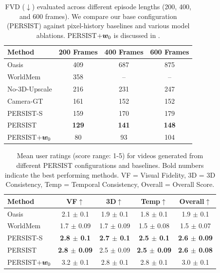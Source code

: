 \begin{table}[t]
  \centering
  \caption{FVD ($\downarrow$) evaluated across different episode lengths (200, 400, and 600 frames). We compare our base configuration (PERSIST) against pixel-history baselines and various model ablations. PERSIST$+{\bm{w}}_0$ is discussed in .}
  \small
  \setlength{\tabcolsep}{6pt}
  \begin{tabular}{lccc}
  \toprule
  Method & 200 Frames & 400 Frames & 600 Frames \\
  \midrule
  Oasis & 409 & 687 & 875 \\
  WorldMem & 358 & -- & -- \\
  \midrule
  No-3D-Upscale & 216 & 231 & 247 \\
  Camera-GT & 161 & 152 & 152 \\
  PERSIST-S & 159 & 170 & 179 \\
  PERSIST & \textbf{129} & \textbf{141} & \textbf{148} \\
  \midrule
  PERSIST$+{\bm{w}}_0$ & 80 & 93 & 104 \\
  \bottomrule
  \end{tabular}
  \label{c4:tab:fvd}
\end{table}

\begin{table}[t]
\centering
\caption{Mean user ratings (score range: 1-5) for videos generated from different PERSIST configurations and baselines. Bold numbers indicate the best performing methods. VF = Visual Fidelity, 3D = 3D Consistency, Temp = Temporal Consistency, Overall = Overall Score.}

\small
\setlength{\tabcolsep}{2.6pt}
\begin{tabular}{lcccc}
    \toprule
    Method & VF$\uparrow$ & 3D$\uparrow$ & Temp$\uparrow$ & Overall$\uparrow$ \\
    \midrule
    Oasis & 2.1 $\pm$ 0.1 & 1.9 $\pm$ 0.1 & 1.8 $\pm$ 0.1 & 1.9 $\pm$ 0.1 \\
    WorldMem & 1.7 $\pm$ 0.09 & 1.7 $\pm$ 0.09 & 1.5 $\pm$ 0.08 & 1.5 $\pm$ 0.07 \\
    PERSIST-S & \textbf{2.8 $\pm$ 0.1} & \textbf{2.7 $\pm$ 0.1} & \textbf{2.5 $\pm$ 0.1} & \textbf{2.6 $\pm$ 0.09} \\
    PERSIST & \textbf{2.8 $\pm$ 0.09} & 2.5 $\pm$ 0.09 & \textbf{2.5 $\pm$ 0.09} & \textbf{2.6 $\pm$ 0.08} \\
    \midrule
    PERSIST$+{\bm{w}}_0$ & 3.2 $\pm$ 0.1 & 2.8 $\pm$ 0.1 & 2.8 $\pm$ 0.1 & 3.0 $\pm$ 0.1 \\
    \bottomrule
    \end{tabular}
    \label{c4:tab:eval}
\end{table}

